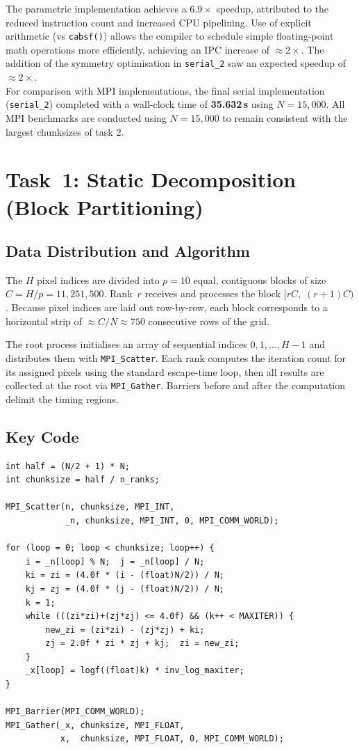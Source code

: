 \documentclass[11pt,a4paper]{article}
\begin{document}
The parametric implementation achieves a $6.9\times$ speedup, attributed to 
the reduced instruction count and increased CPU pipelining. Use of 
explicit arithmetic (vs \texttt{cabsf()}) allows the compiler to schedule 
simple floating-point math operations more efficiently, achieving an IPC 
increase of $\approx 2\times$.
The addition of the symmetry optimisation in \texttt{serial\_2} saw an 
expected speedup of $\approx 2\times$. \\

For comparison with MPI implementations, the final serial implementation 
(\texttt{serial\_2}) completed with a wall-clock time of \textbf{35.632\,s} 
using $N = 15{,}000$. All MPI benchmarks are conducted using $N = 15{,}000$ 
to remain consistent with the largest chunksizes of task 2.


\section{Task~1: Static Decomposition (Block Partitioning)}

\subsection{Data Distribution and Algorithm}

The $H$ pixel indices are divided into $p = 10$ equal, contiguous blocks of
size $C = H / p = 11{,}251{,}500$. Rank~$r$ receives and processes
the block $[rC,\; (r{+}1)C)$. Because pixel indices are laid out
row-by-row, each block corresponds to a horizontal strip of
$\approx C/N \approx 750$ consecutive rows of the grid.

The root process initialises an array of sequential indices $0, 1, \ldots,
H{-}1$ and distributes them with \texttt{MPI\_Scatter}. Each rank computes
the iteration count for its assigned pixels using the standard escape-time
loop, then all results are collected at the root via \texttt{MPI\_Gather}.
Barriers before and after the computation delimit the timing regions.

\vfill
\subsection{Key Code}
\begin{lstlisting}
int half = (N/2 + 1) * N;
int chunksize = half / n_ranks;

MPI_Scatter(n, chunksize, MPI_INT,
            _n, chunksize, MPI_INT, 0, MPI_COMM_WORLD);

for (loop = 0; loop < chunksize; loop++) {
    i = _n[loop] % N;  j = _n[loop] / N;
    ki = zi = (4.0f * (i - (float)N/2)) / N;
    kj = zj = (4.0f * (j - (float)N/2)) / N;
    k = 1;
    while (((zi*zi)+(zj*zj) <= 4.0f) && (k++ < MAXITER)) {
        new_zi = (zi*zi) - (zj*zj) + ki;
        zj = 2.0f * zi * zj + kj;  zi = new_zi;
    }
    _x[loop] = logf((float)k) * inv_log_maxiter;
}

MPI_Barrier(MPI_COMM_WORLD);
MPI_Gather(_x, chunksize, MPI_FLOAT,
           x,  chunksize, MPI_FLOAT, 0, MPI_COMM_WORLD);
\end{lstlisting}
\end{document}
